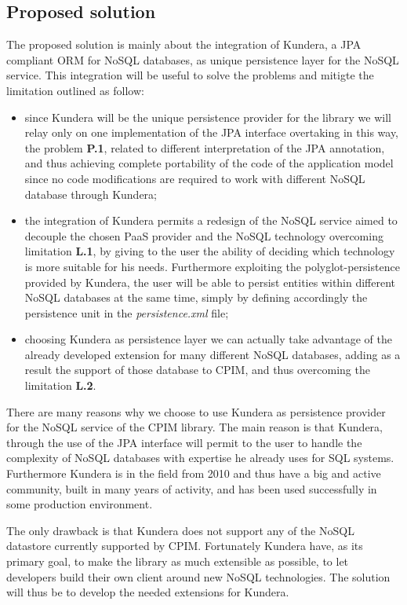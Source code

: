 \subsection{Proposed solution}
The proposed solution is mainly about the integration of Kundera, a JPA compliant ORM for NoSQL databases, as unique persistence layer for the NoSQL service. This integration will be useful to solve the problems and mitigte the limitation outlined as follow:
\begin{itemize}
\item since Kundera will be the unique persistence provider for the library we will relay only on one implementation of the JPA interface overtaking in this way, the problem \textbf{P.1}, related to different interpretation of the JPA annotation, and thus achieving complete portability of the code of the application model since no code modifications are required to work with different NoSQL database through Kundera;
\item the integration of Kundera permits a redesign of the NoSQL service aimed to decouple the chosen PaaS provider and the NoSQL technology overcoming limitation \textbf{L.1}, by giving to the user the ability of deciding which technology is more suitable for his needs. Furthermore exploiting the polyglot-persistence provided by Kundera, the user will be able to persist entities within different NoSQL databases at the same time, simply by defining accordingly the persistence unit in the \textit{persistence.xml} file;
\item choosing Kundera as persistence layer we can actually take advantage of the already developed extension for many different NoSQL databases, adding as a result the support of those database to CPIM, and thus overcoming the limitation \textbf{L.2}.
\end{itemize}

\noindent There are many reasons why we choose to use Kundera as persistence provider for the NoSQL service of the CPIM library. The main reason is that Kundera, through the use of the JPA interface will permit to the user to handle the complexity of NoSQL databases with expertise he already uses for SQL systems. Furthermore Kundera is in the field from 2010 and thus have a big and active community, built in many years of activity, and has been used successfully in some production environment.

\noindent The only drawback is that Kundera does not support any of the NoSQL datastore currently supported by CPIM. Fortunately Kundera have, as its primary goal, to make the library as much extensible as possible, to let developers build their own client around new NoSQL technologies. The solution will thus be to develop the needed extensions for Kundera.

